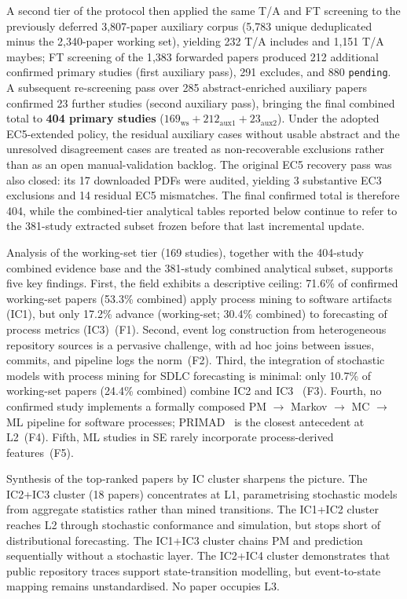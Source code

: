 A second tier of the protocol then applied the same T/A and FT screening to
the previously deferred 3{,}807-paper auxiliary corpus (5{,}783 unique
deduplicated minus the 2{,}340-paper working set), yielding 232 T/A
includes and 1{,}151 T/A maybes; FT screening of the 1{,}383 forwarded
papers produced 212 additional confirmed primary studies (first auxiliary
pass), 291 excludes, and 880 \texttt{pending}. A subsequent re-screening
pass over 285 abstract-enriched auxiliary papers confirmed 23 further
studies (second auxiliary pass), bringing the final combined total to
\textbf{404 primary studies} ($169_{\text{ws}} + 212_{\text{aux1}} +
23_{\text{aux2}}$). Under the adopted EC5-extended policy, the residual
auxiliary cases without usable abstract and the unresolved disagreement
cases are treated as non-recoverable exclusions rather than as an open
manual-validation backlog. The original EC5 recovery pass was also closed:
its 17 downloaded PDFs were audited, yielding 3 substantive EC3 exclusions
and 14 residual EC5 mismatches. The final confirmed total is therefore 404,
while the combined-tier analytical tables reported below continue to refer to
the 381-study extracted subset frozen before that last incremental update.

Analysis of the working-set tier (169 studies), together with the 404-study
combined evidence base and the 381-study combined analytical subset, supports
five key findings. First, the field exhibits a descriptive
ceiling: 71.6\% of confirmed working-set papers (53.3\% combined) apply
process mining to software artifacts (IC1), but only 17.2\% advance
(working-set; 30.4\% combined) to forecasting of process metrics
(IC3)~(F1). Second, event log construction from heterogeneous repository
sources is a pervasive challenge, with ad hoc joins between issues, commits,
and pipeline logs the norm~(F2). Third, the integration of stochastic models
with process mining for SDLC forecasting is minimal: only 10.7\% of
working-set papers (24.4\% combined) combine IC2 and IC3 ~(F3). Fourth, no
confirmed study implements
a formally composed PM $\rightarrow$ Markov $\rightarrow$ MC $\rightarrow$ ML
pipeline for software processes; PRIMAD~\cite{guinea2025} is the closest
antecedent at L2~(F4). Fifth, ML studies in SE rarely incorporate process-derived
features~(F5).

Synthesis of the top-ranked papers by IC cluster sharpens the picture. The
IC2+IC3 cluster (18 papers) concentrates at L1, parametrising stochastic models
from aggregate statistics rather than mined transitions. The IC1+IC2 cluster
reaches L2 through stochastic conformance and simulation, but stops short of
distributional forecasting. The IC1+IC3 cluster chains PM and prediction
sequentially without a stochastic layer. The IC2+IC4 cluster demonstrates that
public repository traces support state-transition modelling, but event-to-state
mapping remains unstandardised. No paper occupies L3.


